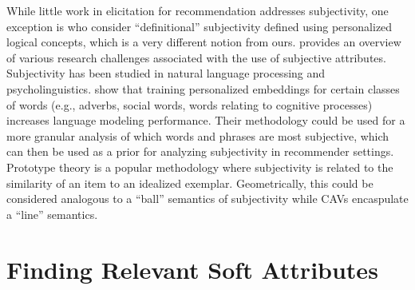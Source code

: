 \documentclass[manuscript,screen,nonacm]{acmart}
\newcommand{\1}{{\mathbf 1}}
\theoremstyle{TheoremNum}
\begin{document}
While little work in elicitation for recommendation addresses subjectivity, one exception is \cite{brv:icml09,brv:aaai10} who consider ``definitional'' subjectivity defined using personalized logical concepts, which is a very different notion from ours. \citet{aaaisubjattributes} provides an overview of various research challenges associated with the use of subjective attributes.
Subjectivity has been studied in natural language processing and psycholinguistics. \citet{welch2020} show that training personalized embeddings for certain classes of words (e.g., adverbs, social words, words relating to cognitive processes) increases language modeling performance. Their methodology could be used for a more granular analysis of which words and phrases are most subjective, which can then be used as a prior for analyzing subjectivity in recommender settings. Prototype theory \cite{osherson1981} is a popular methodology where subjectivity is related to the similarity of an item to an idealized exemplar. 
Geometrically, this could be considered analogous to a ``ball'' semantics of subjectivity while CAVs encaspulate a ``line'' semantics. 

\section{Finding Relevant Soft Attributes}
\label{sec:objectiveCAVs}
\end{document}
